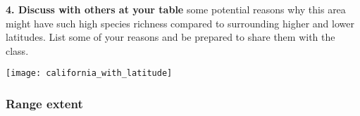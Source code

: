 \documentclass[11pt]{article}
\begin{document}
%
%
%
%
%

\textbf{4. Discuss with others at your table} some potential reasons why this area might have such high
species richness compared to surrounding higher and lower latitudes.
List some of your reasons and be prepared to share them with the class.

\newpage

\begin{center}
	\texttt{[image: california\_with\_latitude]}
\end{center}


\newpage

\subsubsection*{Range extent}
\end{document}
